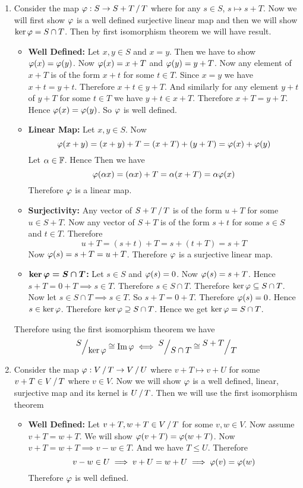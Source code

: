 \documentclass[a4paper, 11pt]{article}
\begin{document}
{\begin{enumerate}[label=(\alph*)]
\item Consider the map $\vph:S\to \quotient{S+T}{T}$ where for any $s\in S$, $s\mapsto s+T$. Now we will first show $\varphi $ is a well defined surjective linear map and then we will show $\ker\varphi=S\cap T$. Then by first isomorphism theorem we will have result.\begin{itemize}
	\item \textbf{Well Defined:} Let $x,y\in S$ and $x=y$. Then we have to show $\varphi(x)=\varphi(y)$. Now $\varphi(x)=x+T$ and $\varphi(y)=y+T$. Now any element of $x+T$ is of the form $x+t$ for some $t\in T$. Since $x=y$ we have $x+t=y+t$. Therefore $x+t\in y+T$. And similarly  for any element $y+t$ of $y+T$ for some $t\in T$ we have $y+t\in x+T$. Therefore $x+T=y+T$. Hence $\varphi(x)=\varphi(y)$. So $\varphi$ is well defined.
	\item \textbf{Linear Map:} Let $x,y\in S$. Now $$\varphi(x+y)=(x+y)+T=(x+T)+(y+T)=\varphi(x)+\varphi(y)$$Let $\alpha\in\mathbb{F}$. Hence Then we have $$\varphi(\alpha x)=(\alpha x)+T=\alpha(x+T)=\alpha\varphi(x)$$Therefore $\varphi$ is a linear map. 
	\item \textbf{Surjectivity:} Any vector of $\quotient{S+T}T$ is of the form $u+T $ for some $u\in S+T$. Now any vector of $S+T$ is of the form $s+t$ for some $s\in S$ and $t\in T$. Therefore $$u+T=(s+t)+T=s+(t+T)=s+T$$Now $\varphi(s)=s+T=u+T$. Therefore $\varphi$ is a surjective linear map. 
	\item $\boldsymbol{\ker\varphi=S\cap T}$\textbf{:} Let $s\in S$ and $\varphi(s)=0$. Now $\varphi(s)=s+T$. Hence $s+T=0+T\implies s\in T$. Therefore $s\in S\cap T$. Therefore $\ker\varphi\subseteq S\cap T$. Now let $s\in S\cap T\implies s\in T$. So $s+T=0+T$. Therefore $\varphi(s)=0$. Hence $s\in \ker\varphi$. Therefore $\ker\varphi\supseteq S\cap T$. Hence we get $\ker\varphi=S\cap T$. 
\end{itemize}
Therefore using the first isomorphism theorem we have $$\quotient{S}{\ker\vph}\cong \Im\vph\iff \quotient{S}{S\cap T}\cong \quotient{S+T}{T}$$
\item Consider the map $\vph:\quotient{V}T\to \quotient{V}{U}$ where $v+T\mapsto v+U$ for some $v+T\in \quotient{V}T$ where $v\in V$. Now we will show $\varphi$ is a well defined, linear, surjective map and its kernel is $\quotient{U}T$. Then we will use the first isomorphism theorem
\begin{itemize}
	\item \textbf{Well Defined:} Let $v+T,w+T\in\quotient{V}{T}$ for some $v,w\in V$. Now assume $v+T=w+T$. We will show $\varphi(v+T)=\varphi(w+T)$. Now $v+T=w+T\implies v-w\in T$. And we have $T\leq U$. Therefore $$v-w\in U\implies v+U=w+U\implies \varphi(v)=\varphi(w)$$Therefore $\varphi$ is well defined.

\end{itemize}
\end{enumerate}}
\end{document}
